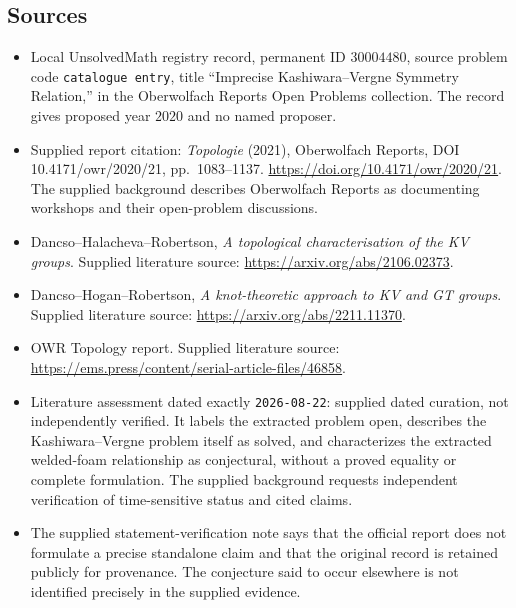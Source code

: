 \documentclass[11pt]{article}
\begin{document}
\subsection{Sources}
\begin{itemize}
\item Local UnsolvedMath registry record, permanent ID \(30004480\), source problem code \texttt{catalogue entry}, title ``Imprecise Kashiwara--Vergne Symmetry Relation,'' in the Oberwolfach Reports Open Problems collection. The record gives proposed year \(2020\) and no named proposer.
\item Supplied report citation: \emph{Topologie} (2021), Oberwolfach Reports, DOI 10.4171/owr/2020/21, pp.~1083--1137. \url{https://doi.org/10.4171/owr/2020/21}. The supplied background describes Oberwolfach Reports as documenting workshops and their open-problem discussions.
\item Dancso--Halacheva--Robertson, \emph{A topological characterisation of the KV groups}. Supplied literature source: \url{https://arxiv.org/abs/2106.02373}.
\item Dancso--Hogan--Robertson, \emph{A knot-theoretic approach to KV and GT groups}. Supplied literature source: \url{https://arxiv.org/abs/2211.11370}.
\item OWR Topology report. Supplied literature source: \url{https://ems.press/content/serial-article-files/46858}.
\item Literature assessment dated exactly \texttt{2026-08-22}: supplied dated curation, not independently verified. It labels the extracted problem open, describes the Kashiwara--Vergne problem itself as solved, and characterizes the extracted welded-foam relationship as conjectural, without a proved equality or complete formulation. The supplied background requests independent verification of time-sensitive status and cited claims.
\item The supplied statement-verification note says that the official report does not formulate a precise standalone claim and that the original record is retained publicly for provenance. The conjecture said to occur elsewhere is not identified precisely in the supplied evidence.
\end{itemize}
\end{document}
